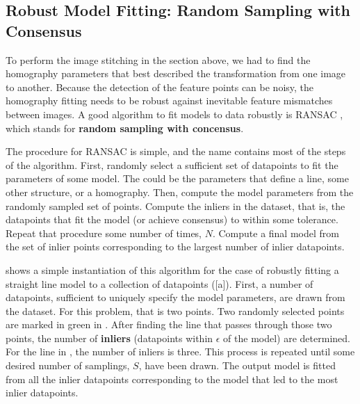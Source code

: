 \subsection{Robust Model Fitting: Random Sampling with Consensus}
\label{sec:RANSAC}

To perform the image stitching in the section above, we had to find the homography parameters that best described the transformation from one image to another. Because the detection of the feature points can be noisy, the homography fitting needs to be robust against inevitable feature mismatches between images.  A good algorithm to fit models to data robustly is  RANSAC \cite{Fischler1981}, which stands for {\bf random sampling with concensus}. 

The procedure for RANSAC is simple, and the name contains most of the steps of the algorithm.  First, randomly select a sufficient set of datapoints to fit the parameters of some model.  The could be the parameters that define a line, some other structure, or a homography.  Then, compute the model parameters from the randomly sampled set of points. Compute the inliers in the dataset, that is, the datapoints that fit the model (or achieve consensus) to within some tolerance.  Repeat that procedure some number of times, $N$.    Compute a final model from the set of inlier points corresponding to the largest number of inlier datapoints.

\Fig{\ref{fig:ransac}} shows a simple instantiation of this algorithm for the case of robustly fitting a straight line model to a collection of datapoints (\fig{\ref{fig:ransac}}[a]).  First, a number of datapoints, sufficient to uniquely specify the model parameters, are drawn from the dataset.  For this problem, that is two points.  Two randomly selected points are marked in green in .  After finding the line that passes through those two points, the number of {\bf inliers} (datapoints within $\epsilon$ of the model) are determined.  For the line in , the number of inliers is three. This process is repeated until some desired number of samplings, $S$, have been drawn.  The output model is fitted from all the inlier datapoints corresponding to the model that led to the most inlier datapoints.

